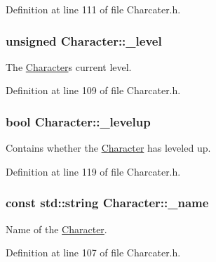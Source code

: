 Definition at line 111 of file Charcater.\+h.

\hypertarget{class_character_ab76c68c70f6b8a7dd0d70291cfaeacaf}{}
\subsubsection[{\+\_\+level}]{\setlength{\rightskip}{0pt plus 5cm}unsigned Character\+::\+\_\+level\hspace{0.3cm}{\ttfamily [protected]}}\label{class_character_ab76c68c70f6b8a7dd0d70291cfaeacaf}
The \hyperlink{class_character}{Character}\textquotesingle{}s current level. 

Definition at line 109 of file Charcater.\+h.

\hypertarget{class_character_a7d661e1d0a7631b0c5a2a06ef0165090}{}
\subsubsection[{\+\_\+levelup}]{\setlength{\rightskip}{0pt plus 5cm}bool Character\+::\+\_\+levelup\hspace{0.3cm}{\ttfamily [protected]}}\label{class_character_a7d661e1d0a7631b0c5a2a06ef0165090}
Contains whether the \hyperlink{class_character}{Character} has leveled up. 

Definition at line 119 of file Charcater.\+h.

\hypertarget{class_character_aa86be1de1ef615913a552b2134fbb966}{}
\subsubsection[{\+\_\+name}]{\setlength{\rightskip}{0pt plus 5cm}const std\+::string Character\+::\+\_\+name\hspace{0.3cm}{\ttfamily [protected]}}\label{class_character_aa86be1de1ef615913a552b2134fbb966}
Name of the \hyperlink{class_character}{Character}. 

Definition at line 107 of file Charcater.\+h.

\hypertarget{class_character_a0f2af69ac7a82ebff650b1a430bb4331}{}
